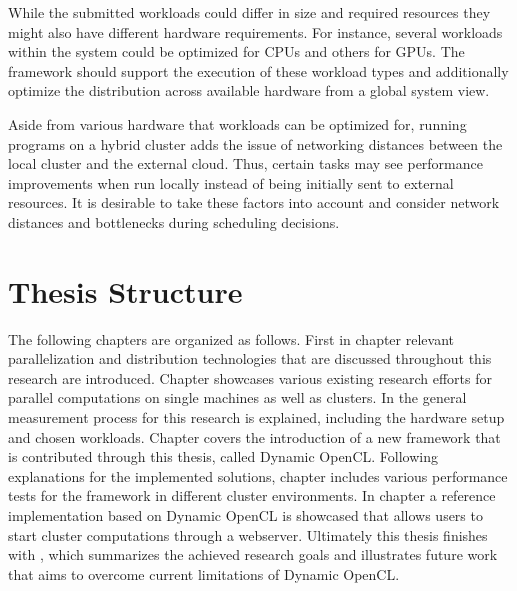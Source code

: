 \begin{description}[style=nextline]
    \item [Workload Diversity]
    While the submitted workloads could differ in size and required resources they might also have different hardware requirements. For instance, several workloads within the system could be optimized for CPUs and others for GPUs. The framework should support the execution of these workload types and additionally optimize the distribution across available hardware from a global system view.

    \item [Optimized Scheduling]
    Aside from various hardware that workloads can be optimized for, running programs on a hybrid cluster adds the issue of networking distances between the local cluster and the external cloud. Thus, certain tasks may see performance improvements when run locally instead of being initially sent to external resources. It is desirable to take these factors into account and consider network distances and bottlenecks during scheduling decisions.

\end{description}


\section*{Thesis Structure}
\label{structure}

The following chapters are organized as follows. First in chapter \textit{} relevant parallelization and distribution technologies that are discussed throughout this research are introduced. Chapter \textit{} showcases various existing research efforts for parallel computations on single machines as well as clusters. In \textit{} the general measurement process for this research is explained, including the hardware setup and chosen workloads. Chapter \textit{} covers the introduction of a new framework that is contributed through this thesis, called Dynamic OpenCL. Following explanations for the implemented solutions, chapter \textit{} includes various performance tests for the framework in different cluster environments. In chapter \textit{} a reference implementation based on Dynamic OpenCL is showcased that allows users to start cluster computations through a webserver. Ultimately this thesis finishes with \textit{}, which summarizes the achieved research goals and illustrates future work that aims to overcome current limitations of Dynamic OpenCL.